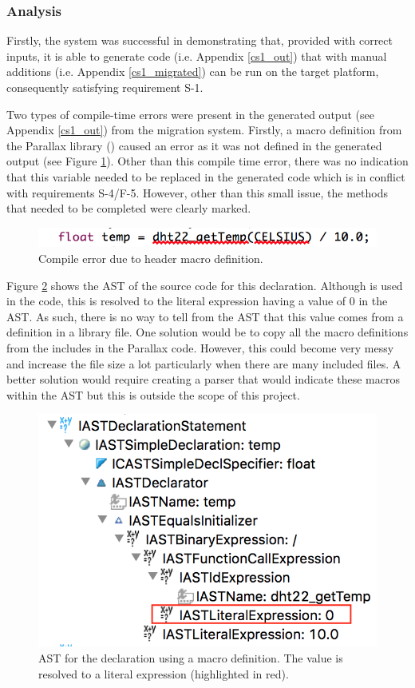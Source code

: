 \documentclass{UoYCSproject}
\begin{document}
\subsubsection{Analysis} \label{cs1_analysis}
Firstly, the system was successful in demonstrating that, provided with correct inputs, it is able to generate code (i.e. Appendix \ref{cs1_out}) that with manual additions (i.e. Appendix \ref{cs1_migrated}) can be run on the target platform, consequently satisfying requirement S-1.
 
Two types of compile-time errors were present in the generated output (see Appendix \ref{cs1_out}) from the migration system. Firstly, a macro definition from the Parallax  library () caused an error as it was not defined in the generated output (see Figure \ref{fig:celsius_error}). Other than this compile time error, there was no indication that this variable needed to be replaced in the generated code which is in conflict with requirements S-4/F-5. However, other than this small issue, the methods that needed to be completed were clearly marked.
\begin{figure}[h!]
  \centering
  \includegraphics[width=0.7\linewidth]{graphics/celsius_error.png}
  \caption{Compile error due to header macro definition.}
  \label{fig:celsius_error}
\end{figure}

Figure \ref{fig:celsius_ast} shows the AST of the source code for this declaration. Although  is used in the code, this is resolved to the literal expression having a value of 0 in the AST. As such, there is no way to tell from the AST that this value comes from a definition in a library file. One solution would be to copy all the macro definitions from the includes in the Parallax code. However, this could become very messy and increase the file size a lot particularly when there are many included files. A better solution would require creating a parser that would indicate these macros within the AST but this is outside the scope of this project.

\begin{figure}[h!]
  \centering
  \includegraphics[width=0.5\linewidth]{graphics/celsius_ast.png}
  \caption{AST for the declaration using a macro definition. The value is resolved to a literal expression (highlighted in red).}
  \label{fig:celsius_ast}
\end{figure}
\end{document}
